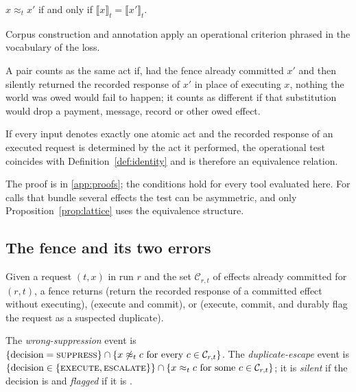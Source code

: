 \begin{definition}\label{def:identity}
$x\approx_t x'$ if and only if $\llbracket x\rrbracket_t=\llbracket x'\rrbracket_t$.
\end{definition}

Corpus construction and annotation apply an operational criterion phrased in the vocabulary of the loss.

\begin{definition}\label{def:operational}
A pair counts as the same act if, had the fence already committed $x'$ and then silently returned the recorded response of $x'$ in place of executing $x$, nothing the world was owed would fail to happen; it counts as different if that substitution would drop a payment, message, record or other owed effect.
\end{definition}

\begin{proposition}\label{prop:equivalence}
If every input denotes exactly one atomic act and the recorded response of an executed request is determined by the act it performed, the operational test coincides with Definition~\ref{def:identity} and is therefore an equivalence relation.
\end{proposition}

The proof is in \ref{app:proofs}; the conditions hold for every tool evaluated here. For calls that bundle several effects the test can be asymmetric, and only Proposition~\ref{prop:lattice} uses the equivalence structure.

\subsection{The fence and its two errors}

\begin{definition}[Fence]\label{def:fence}
Given a request $(t,x)$ in run $r$ and the set $\mathcal{C}_{r,t}$ of effects already committed for $(r,t)$, a fence returns \SUP{} (return the recorded response of a committed effect without executing), \EXE{} (execute and commit), or \ESC{} (execute, commit, and durably flag the request as a suspected duplicate).
\end{definition}

\begin{definition}[Errors]\label{def:errors}
The \emph{wrong-suppression} event is $\{\text{decision}=\SUP\}\cap\{x\not\approx_t c\ \text{for every } c\in\mathcal{C}_{r,t}\}$. The \emph{duplicate-escape} event is $\{\text{decision}\in\{\textsc{execute},\textsc{escalate}\}\}\cap\{x\approx_t c\ \text{for some } c\in\mathcal{C}_{r,t}\}$; it is \emph{silent} if the decision is \EXE{} and \emph{flagged} if it is \ESC.
\end{definition}

